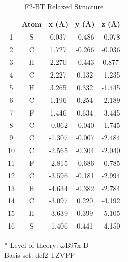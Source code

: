 \begin{table}[hbt!]\centering
\caption{F2-BT Relaxed Structure}
\renewcommand{\arraystretch}{1.5}
\begin{threeparttable}
\begin{tabular}{ccccc}\toprule
{} & {Atom} & {x (\AA)} & {y (\AA)} & {z (\AA)} \\ \midrule
    1 & S & 0.037 & -0.486 & -0.078\\
    2 & C & 1.727 & -0.266 & -0.036\\
    3 & H & 2.270 & -0.443 & 0.877\\
    4 & C & 2.227 & 0.132 & -1.235\\
    5 & H & 3.265 & 0.332 & -1.445\\
    6 & C & 1.196 & 0.254 & -2.189\\
    7 & F & 1.446 & 0.634 & -3.445\\
    8 & C & -0.062 & -0.040 & -1.745\\
    9 & C & -1.307 & -0.007 & -2.484\\
    10 & C & -2.565 & -0.304 & -2.040\\
    11 & F & -2.815 & -0.686 & -0.785\\
    12 & C & -3.596 & -0.181 & -2.994\\
    13 & H & -4.634 & -0.382 & -2.784\\
    14 & C & -3.097 & 0.220 & -4.192\\
    15 & H & -3.639 & 0.399 & -5.105\\
    16 & S & -1.406 & 0.441 & -4.150\\ \bottomrule
\end{tabular}
\begin{tablenotes}
\item[*] \footnotesize Level of theory: $\omega$B97x-D \\ Basis set: def2-TZVPP
\end{tablenotes}
\end{threeparttable}
\end{table}

